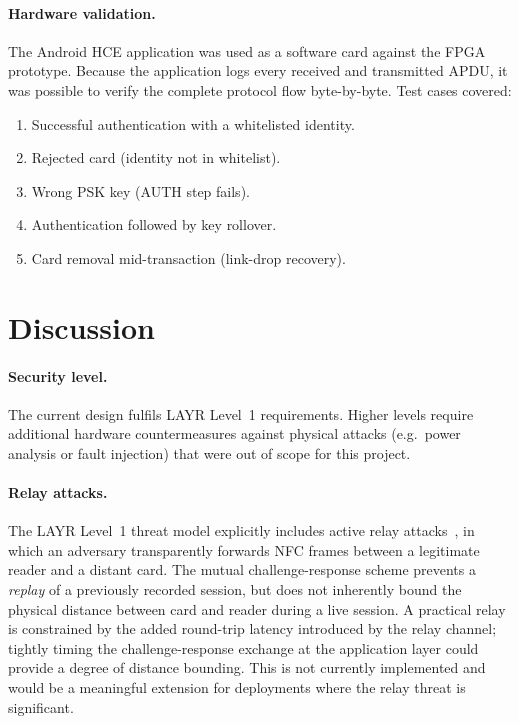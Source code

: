 \documentclass[manuscript,screen,nonacm]{acmart}
\begin{document}
\paragraph{Hardware validation.}
The Android HCE application was used as a software card against the
FPGA prototype.
Because the application logs every received and transmitted APDU,
it was possible to verify the complete protocol flow byte-by-byte.
Test cases covered:
\begin{enumerate}
  \item Successful authentication with a whitelisted identity.
  \item Rejected card (identity not in whitelist).
  \item Wrong PSK key (AUTH step fails).
  \item Authentication followed by key rollover.
  \item Card removal mid-transaction (link-drop recovery).
\end{enumerate}

\section{Discussion}
\label{sec:discussion}

\paragraph{Security level.}
The current design fulfils LAYR Level~1 requirements.
Higher levels require additional hardware countermeasures against
physical attacks (e.g.\ power analysis or fault injection) that were
out of scope for this project.

\paragraph{Relay attacks.}
The LAYR Level~1 threat model explicitly includes active relay
attacks~\cite{hancke2005relay}, in which an adversary transparently
forwards NFC frames between a legitimate reader and a distant card.
The mutual challenge-response scheme prevents a \emph{replay} of a
previously recorded session, but does not inherently bound the
physical distance between card and reader during a live session.
A practical relay is constrained by the added round-trip latency
introduced by the relay channel; tightly timing the challenge-response
exchange at the application layer could provide a degree of distance
bounding.
This is not currently implemented and would be a meaningful extension
for deployments where the relay threat is significant.
\end{document}

